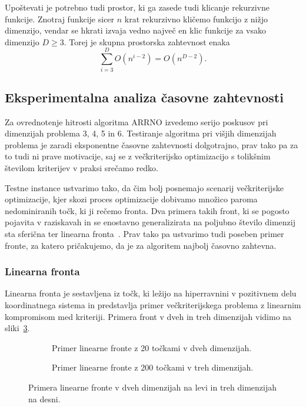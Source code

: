 Upoštevati je potrebno tudi prostor, ki ga zasede tudi klicanje rekurzivne funkcije. Znotraj funkcije sicer $n$ krat rekurzivno kličemo funkcijo z nižjo dimenzijo, vendar se hkrati izvaja vedno največ en klic funkcije za vsako dimenzijo $D \geq 3$. Torej je skupna prostorska zahtevnost enaka
\[
\sum_{i=3}^D O(n^{i-2}) = O(n^{D-2}).
\]

\subsection{Eksperimentalna analiza časovne zahtevnosti}
Za ovrednotenje hitrosti algoritma ARRNO izvedemo serijo poskusov pri dimenzijah problema 3, 4, 5 in 6. Testiranje algoritma pri višjih dimenzijah problema je zaradi eksponentne časovne zahtevnosti dolgotrajno, prav tako pa za to tudi ni prave motivacije, saj se z večkriterijsko optimizacijo s tolikšnim številom kriterijev v praksi srečamo redko. 

Testne instance ustvarimo tako, da čim bolj posnemajo scenarij večkriterijske optimizacije, kjer skozi proces optimizacije dobivamo množico paroma nedominiranih točk, ki ji rečemo fronta. Dva primera takih front, ki se pogosto pojavita v raziskavah in se enostavno generalizirata na poljubno število dimenzij sta sferična ter linearna fronta~\cite{Tusar15tevc}. Prav tako pa ustvarimo tudi poseben primer fronte, za katero pričakujemo, da je za algoritem najbolj časovno zahtevna. 

\subsubsection{Linearna fronta}
Linearna fronta je sestavljena iz točk, ki ležijo na hiperravnini v pozitivnem delu koordinatnega sistema in predstavlja primer večkriterijskega problema z linearnim kompromisom med kriteriji. Primera front v dveh in treh dimenzijah vidimo na sliki~\ref{fig:linear_front}.

\begin{figure}[th]
    \centering
    \begin{subfigure}{0.45\textwidth}
        \centering
        
        \caption{Primer linearne fronte z 20 točkami v dveh dimenzijah.}
        \label{fig:front_linear_2d}
    \end{subfigure}
    \hfill
    \begin{subfigure}{0.45\textwidth}
        \centering
        
        \caption{Primer linearne fronte z 200 točkami v treh dimenzijah.}
        \label{fig:front_linear_3d}
    \end{subfigure}
    \caption{Primera linearne fronte v dveh dimenzijah na levi in treh dimenzijah na desni.}
    \label{fig:linear_front}
\end{figure}

